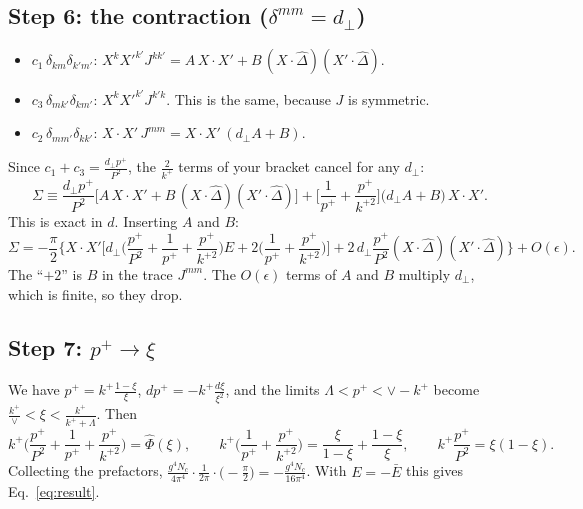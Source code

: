 \documentclass[10pt]{article}
\numberwithin{equation}{section}
\newcommand{\Dh}{\hat\Delta}
\begin{document}
\subsection{Step 6: the contraction (\texorpdfstring{$\delta^{mm}=d_\perp$}{delta mm = d})}\label{sec:contract}
\begin{itemize}
\item $c_1\,\delta_{km}\delta_{k'm'}$: $X^kX'^{k'}J^{kk'}=A\,X\cdot X'+B\,(X\cdot\Dh)(X'\cdot\Dh)$.
\item $c_3\,\delta_{mk'}\delta_{km'}$: $X^kX'^{k'}J^{k'k}$. This is the same, because $J$ is symmetric.
\item $c_2\,\delta_{mm'}\delta_{kk'}$: $X\cdot X'\,J^{mm}=X\cdot X'\,(d_\perp A+B)$.
\end{itemize}
Since $c_1+c_3=\frac{d_\perp p^+}{P^2}$, the $\frac{2}{k^+}$ terms of your bracket cancel for any $d_\perp$:
\begin{equation}
\Sigma\equiv\frac{d_\perp p^+}{P^2}\Big[A\,X\cdot X'+B\,(X\cdot\Dh)(X'\cdot\Dh)\Big]+\Big[\frac1{p^+}+\frac{p^+}{k^{+2}}\Big]\big(d_\perp A+B\big)\,X\cdot X'.
\label{eq:Sigma}
\end{equation}
This is exact in $d$. Inserting $A$ and $B$:
\begin{equation}
\Sigma=-\frac\pi2\Big\{X\cdot X'\Big[d_\perp\Big(\frac{p^+}{P^2}+\frac1{p^+}+\frac{p^+}{k^{+2}}\Big)E+2\Big(\frac1{p^+}+\frac{p^+}{k^{+2}}\Big)\Big]+2\,d_\perp\frac{p^+}{P^2}(X\cdot\Dh)(X'\cdot\Dh)\Big\}+O(\epsilon).
\end{equation}
The ``$+2$'' is $B$ in the trace $J^{mm}$. The $O(\epsilon)$ terms of $A$ and $B$ multiply $d_\perp$, which is finite, so they drop.

\subsection{Step 7: \texorpdfstring{$p^+\to\xi$}{p+ to xi}}
We have $p^+=k^+\frac{1-\xi}{\xi}$, $dp^+=-k^+\frac{d\xi}{\xi^2}$, and the limits $\Lambda<p^+<\vee-k^+$ become $\frac{k^+}{\vee}<\xi<\frac{k^+}{k^++\Lambda}$. Then
\begin{equation}
k^+\Big(\frac{p^+}{P^2}+\frac1{p^+}+\frac{p^+}{k^{+2}}\Big)=\hat\Phi(\xi),\qquad k^+\Big(\frac{1}{p^+}+\frac{p^+}{k^{+2}}\Big)=\frac{\xi}{1-\xi}+\frac{1-\xi}{\xi},\qquad k^+\frac{p^+}{P^2}=\xi(1-\xi).
\end{equation}
Collecting the prefactors, $\frac{g^4N_c}{4\pi^4}\cdot\frac{1}{2\pi}\cdot\big(-\frac{\pi}{2}\big)=-\frac{g^4N_c}{16\pi^4}$. With $E=-\bar E$ this gives Eq.~\eqref{eq:result}.
\end{document}
